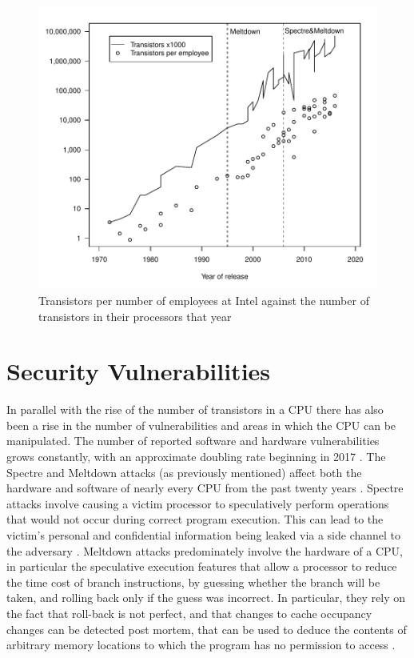 \begin{figure}
	\includegraphics[width=\linewidth]{cpu-complexity/cpucomplexity.pdf}
	\caption{Transistors per number of employees at Intel against the number of transistors in their processors that year \cite{RN22, RN23, RN24, RN25, RN26}}
	\label{fig:transistor_graph}
\end{figure}


\section{Security Vulnerabilities}

	In parallel with the rise of the number of transistors in a CPU there has also been a rise in the number of vulnerabilities and areas in which the CPU can be manipulated. The number of reported software and hardware vulnerabilities grows constantly, with an approximate doubling rate beginning in 2017 \cite{RN17}. The Spectre and Meltdown attacks (as previously mentioned) affect both the hardware and software of nearly every CPU from the past twenty years \cite{RN15}. Spectre attacks involve causing a victim processor to speculatively perform operations that would not occur during correct program execution. This can lead to the victim’s personal and confidential information being leaked via a side channel to the adversary \cite{RN16}. Meltdown attacks predominately involve the hardware of a CPU, in particular the speculative execution features that allow a processor to reduce the time cost of branch instructions, by guessing whether the branch will be taken, and rolling back only if the guess was incorrect. In particular, they rely on the fact that roll-back is not perfect, and that changes to cache occupancy changes can be detected post mortem, that can be used to deduce the contents of arbitrary memory locations to which the program has no permission to access \cite{RN3}.


